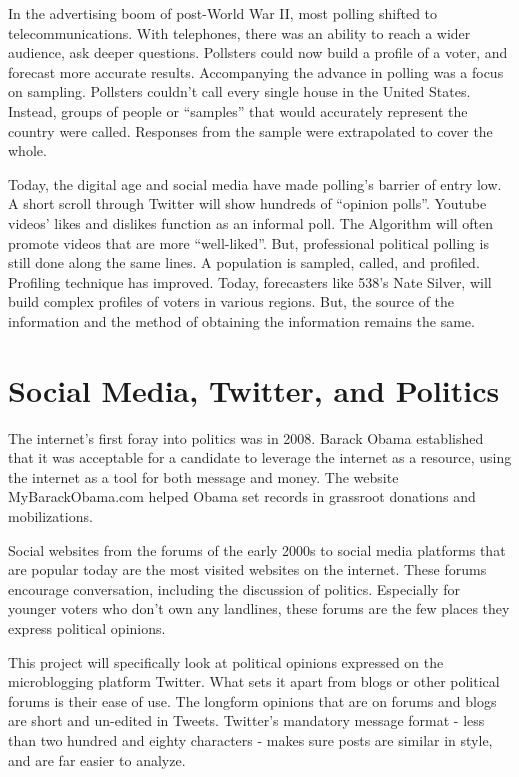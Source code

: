 \documentclass[11pt, twoside, reqno]{book}
\begin{document}
In the advertising boom of post-World War II, most polling shifted to telecommunications. With telephones, there was an ability to reach a wider audience, ask deeper questions. Pollsters could now build a profile of a voter, and forecast more accurate results. Accompanying the advance in polling was a focus on sampling. Pollsters couldn’t call every single house in the United States. Instead, groups of people or “samples” that would accurately represent the country were called. Responses from the sample were extrapolated to cover the whole. 

Today, the digital age and social media have made polling’s barrier of entry low. A short scroll through Twitter will show hundreds of “opinion polls”. Youtube videos’ likes and dislikes function as an informal poll. The Algorithm will often promote videos that are more “well-liked”. But, professional political polling is still done along the same lines. A population is sampled, called, and profiled. Profiling technique has improved. Today, forecasters like 538’s Nate Silver, will build complex profiles of voters in various regions. But, the source of the information and the method of obtaining the information remains the same. 

\section{Social Media, Twitter, and Politics}
\hspace{0.1in}The internet’s first foray into politics was in 2008. Barack Obama established that it was acceptable for a candidate to leverage the internet as a resource, using the internet as a tool for both message and money. The website MyBarackObama.com helped Obama set records in grassroot donations and mobilizations. 

Social websites from the forums of the early 2000s to social media platforms that are popular today are the most visited websites on the internet. These forums encourage conversation, including the discussion of politics. Especially for younger voters who don’t own any landlines, these forums are the few places they express political opinions. 

This project will specifically look at political opinions expressed on the microblogging platform Twitter. What sets it apart from blogs or other political forums is their ease of use. The longform opinions that are on forums and blogs are short and un-edited in Tweets. Twitter’s mandatory message format - less than two hundred and eighty characters - makes sure posts are similar in style, and are far easier to analyze. 
\end{document}
